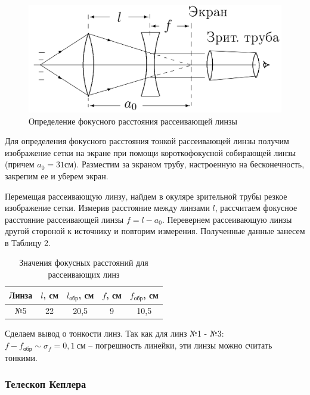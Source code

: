 \documentclass[a4paper,12pt]{article}
\begin{document}
\newpage

\begin{figure} 
	\includegraphics[width=\linewidth]{fig2}
	\caption{Определение фокусного расстояния рассеивающей линзы}
	\label{collecting_lens}
\end{figure}

Для определения фокусного расстояния тонкой рассеивающей линзы получим изображение сетки на экране при помощи короткофокусной собирающей линзы (причем $a_0 = 31 см$). Разместим за экраном трубу, настроенную на бесконечность, закрепим ее и уберем экран. 

Перемещая рассеивающую линзу, найдем в окуляре зрительной трубы резкое изображение сетки. Измерив расстояние между линзами $l$, рассчитаем фокусное расстояние рассеивающей линзы $f = l - a_0$. Перевернем рассеивающую линзы другой стороной к источнику и повторим измерения. Полученные данные занесем в Таблицу 2.

\begin{table}[h]
	\begin{center}
	\caption{Значения фокусных расстояний для рассеивающих линз}
	\begin{tabular}{|c|c|c|c|c|}
	\hline
	\textbf{Линза} & \textbf{$l$, см} & \textbf{$l_{обр}$, см} & \textbf{$f$, см} & 			\textbf{$f_{обр}$, см} \\ \hline
	№5    & 22    & 20,5       & 9              & 10,5                	\\ \hline
	\end{tabular}
	\end{center}
\end{table}

Сделаем вывод о тонкости линз. Так как для линз №1 - №3: $f - f_{обр} \sim \sigma_{f} = 0,1 \ см$ -- погрешность линейки, эти линзы можно считать тонкими.

\subsubsection*{Телескоп Кеплера}
\end{document}

